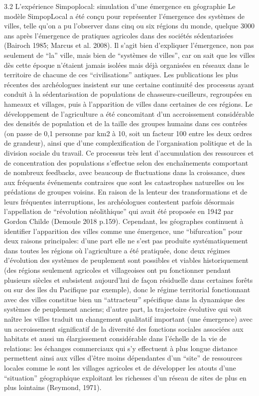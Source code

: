 \documentclass[10pt]{article}
\begin{document}
3.2 L’expérience Simpoplocal: simulation d’une émergence en géographie
Le modèle SimpopLocal a été conçu pour représenter l’émergence des systèmes de villes, telle qu’on a pu l’observer dans cinq ou six régions du monde, quelque 3000 ans après l’émergence de pratiques agricoles dans des sociétés sédentarisées (Bairoch 1985; Marcus et al. 2008). Il s’agit bien d’expliquer l’émergence, non pas seulement de “la” ville, mais bien de “systèmes de villes”, car on sait que les villes dès cette époque n’étaient jamais isolées mais déjà organisées en réseaux dans le territoire de chacune de ces “civilisations” antiques. Les publications les plus récentes des archéologues insistent sur une certaine continuité des processus ayant conduit à la sédentarisation de populations de chasseurs-cueilleurs, regroupées en hameaux et villages, puis à l’apparition de villes dans certaines de ces régions. Le développement de l’agriculture a été concomitant d’un accroissement considérable des densités de population et de la taille des groupes humains dans ces contrées (on passe de 0,1 personne par km2 à 10, soit un facteur 100 entre les deux ordres de grandeur), ainsi que d’une complexification de l’organisation politique et de la division sociale du travail. Ce processus très lent d’accumulation des ressources et de concentration des populations s’effectue selon des enchaînements comportant de nombreux feedbacks, avec beaucoup de fluctuations dans la croissance, dues aux fréquents événements contraires que sont les catastrophes naturelles ou les prédations de groupes voisins. En raison de la lenteur des transformations et de leurs fréquentes interruptions, les archéologues contestent parfois désormais l’appellation de “révolution néolithique” qui avait été proposée en 1942 par Gordon Childe (Demoule 2018 p.159). 
Cependant, les géographes continuent à identifier l’apparition des villes comme une émergence, une “bifurcation” pour deux raisons principales: d’une part elle ne s’est pas produite systématiquement dans toutes les régions où l’agriculture a été pratiquée, donc deux régimes d’évolution des systèmes de peuplement sont possibles et viables historiquement (des régions seulement agricoles et villageoises ont pu fonctionner pendant plusieurs siècles et subsistent aujourd’hui de façon résiduelle dans certaines forêts ou sur des îles du Pacifique par exemple), donc le régime territorial fonctionnant avec des villes constitue bien un “attracteur” spécifique dans la dynamique des systèmes de peuplement anciens; d’autre part, la trajectoire évolutive qui voit naître les villes traduit un changement qualitatif important (une émergence) avec un accroissement significatif de la diversité des fonctions sociales associées aux habitats et aussi un élargissement considérable dans l’échelle de la vie de relations: les échanges commerciaux qui s’y effectuent à plus longue distance permettent ainsi aux villes d’être moins dépendantes d’un “site” de ressources locales comme le sont les villages agricoles et de développer les atouts d’une “situation” géographique exploitant les richesses d’un réseau de sites de plus en plus lointains (Reymond, 1971). 
\end{document}
